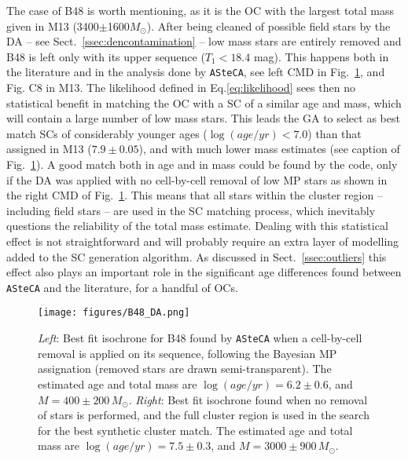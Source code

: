 \documentclass[a4paper,fleqn,usenatbib]{mnras}
\begin{document}
The case of B48 is worth mentioning, as it is the OC with the largest total mass
given in M13 (3400$\pm$1600$M_{\odot}$).
After being cleaned of possible field stars by the DA -- see
Sect.~\ref{ssec:dencontamination} -- low mass stars are entirely removed and B48
is left only with its upper sequence ($T_1<18.4$ mag).
This happens both in the literature and in the analysis done by \texttt{ASteCA},
see left CMD in Fig.~\ref{fig:B48_DA}, and Fig. C8 in M13.
%
The likelihood defined in Eq.\ref{eq:likelihood} sees then no statistical
benefit in matching the OC with a SC of a similar age and mass,
which will contain a large number of low mass stars.
This leads the GA to select as best match SCs of considerably
younger ages ($\log(age/yr){<}7.0$) than that assigned in M13 ($7.9\pm0.05$),
and with much lower mass estimates (see caption of Fig.~\ref{fig:B48_DA}).
%
%
A good match both in age and in mass could be found by the code, only if the DA
was applied with no cell-by-cell removal of low MP stars as shown in the right
CMD of Fig.~\ref{fig:B48_DA}. This means that all stars within the cluster
region -- including field stars -- are used in the SC matching process, which
inevitably questions the reliability of the total mass estimate.
%
Dealing with this statistical effect is not straightforward and will probably
require an extra layer of modelling added to the SC generation algorithm.
As discussed in Sect.~\ref{ssec:outliers} this effect also plays an important
role in the significant age differences found between \texttt{ASteCA} and the
literature, for a handful of OCs.

\begin{figure}
\texttt{[image: figures/B48\_DA.png]}
\caption{\emph{Left}: Best fit isochrone for B48 found by \texttt{ASteCA} when
a cell-by-cell removal is applied on its sequence, following the Bayesian MP
assignation (removed stars are drawn semi-transparent). The estimated age and
total mass are $\log(age/yr){=}6.2{\pm}0.6$, and $M{=}400{\pm}200\,M_{\odot}$.
\emph{Right}: Best fit isochrone found when no removal of stars is performed,
and the full cluster region is used in the search for the best synthetic
cluster match. The estimated age and total mass are
$\log(age/yr){=}7.5{\pm}0.3$, and $M{=}3000{\pm}900\,M_{\odot}$.}
\label{fig:B48_DA}
\end{figure}
\end{document}
